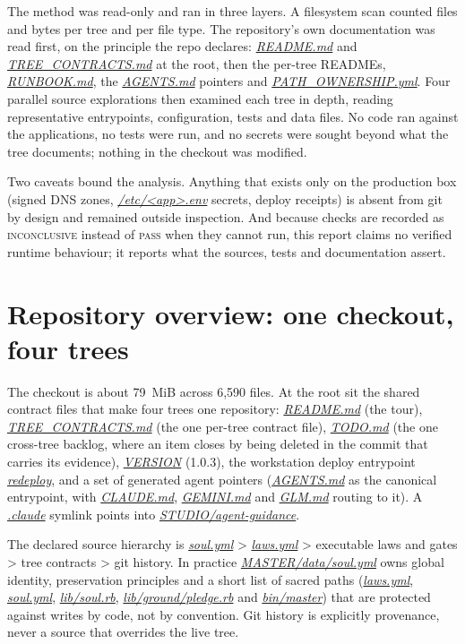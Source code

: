 \documentclass[oneside]{article}
\newcommand{\fpath}[1]{\emph{\url{#1}}}
\begin{document}
The method was read-only and ran in three layers. A filesystem scan counted files and bytes per tree and per file type. The repository's own documentation was read first, on the principle the repo declares: \fpath{README.md} and \fpath{TREE_CONTRACTS.md} at the root, then the per-tree READMEs, \fpath{RUNBOOK.md}, the \fpath{AGENTS.md} pointers and \fpath{PATH_OWNERSHIP.yml}. Four parallel source explorations then examined each tree in depth, reading representative entrypoints, configuration, tests and data files. No code ran against the applications, no tests were run, and no secrets were sought beyond what the tree documents; nothing in the checkout was modified.

Two caveats bound the analysis. Anything that exists only on the production box (signed DNS zones, \fpath{/etc/<app>.env} secrets, deploy receipts) is absent from git by design and remained outside inspection. And because checks are recorded as \textsc{inconclusive} instead of \textsc{pass} when they cannot run, this report claims no verified runtime behaviour; it reports what the sources, tests and documentation assert.

\section{Repository overview: one checkout, four trees}

The checkout is about 79~MiB across 6,590 files. At the root sit the shared contract files that make four trees one repository: \fpath{README.md} (the tour), \fpath{TREE_CONTRACTS.md} (the one per-tree contract file), \fpath{TODO.md} (the one cross-tree backlog, where an item closes by being deleted in the commit that carries its evidence), \fpath{VERSION} (1.0.3), the workstation deploy entrypoint \fpath{redeploy}, and a set of generated agent pointers (\fpath{AGENTS.md} as the canonical entrypoint, with \fpath{CLAUDE.md}, \fpath{GEMINI.md} and \fpath{GLM.md} routing to it). A \fpath{.claude} symlink points into \fpath{STUDIO/agent-guidance}.

The declared source hierarchy is \fpath{soul.yml} \textgreater{} \fpath{laws.yml} \textgreater{} executable laws and gates \textgreater{} tree contracts \textgreater{} git history. In practice \fpath{MASTER/data/soul.yml} owns global identity, preservation principles and a short list of sacred paths (\fpath{laws.yml}, \fpath{soul.yml}, \fpath{lib/soul.rb}, \fpath{lib/ground/pledge.rb} and \fpath{bin/master}) that are protected against writes by code, not by convention. Git history is explicitly provenance, never a source that overrides the live tree.
\end{document}
